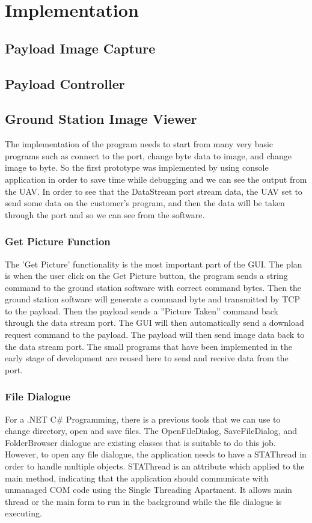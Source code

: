 \documentclass[oneside]{ecsgdp}         %
\begin{document}
\chapter{Implementation}


\section{Payload Image Capture}

\section{Payload Controller}

\section{Ground Station Image Viewer}
The implementation of the program needs to start from many very basic programs such as connect to the port, change byte data to image, and change image to byte. 
So the first prototype was implemented by using console application in order to save time while debugging and we can see the output from the UAV. In order to see that the DataStream port stream data, the UAV set to send some data on the customer’s program, and then the data will be taken through the port and so we can see from the software.  

\subsection{Get Picture Function}
The 'Get Picture' functionality is the most important part of the GUI. The plan is when the user click on the Get Picture button, the program sends a string command to the ground station software with correct command bytes. Then the ground station software will generate a command byte and transmitted by TCP to the payload. Then the payload sends a ''Picture Taken'' command back through the data stream port. The GUI will then automatically send a download request command to the payload. The payload will then send image data back to the data stream port. The small programs that have been implemented in the early stage of development are reused here to send and receive data from the port. 

\subsection{File Dialogue}
For a .NET C\# Programming, there is a previous tools that we can use to change directory, open and save files. The OpenFileDialog,  SaveFileDialog, and FolderBrowser dialogue are existing classes that is suitable to do this job. However, to open any file dialogue, the application needs to have a STAThread in order to handle multiple objects. STAThread is an attribute which applied to the main method, indicating that the application should communicate with unmanaged COM code using the Single Threading Apartment. It allows main thread or the main form to run in the background while the file dialogue is executing. 
\end{document}
